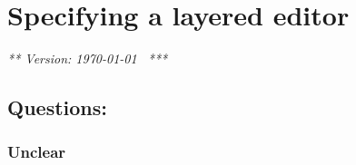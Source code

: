 \chapter{Specifying a layered editor}
\label{chap:singleLayer}

\renewcommand{\present}{\ensuremath{\mathit{present}}}
\renewcommand{\interpret}{\ensuremath{\mathit{interpret}}}
\newcommand{\spc}{\textvisiblespace}


\renewcommand{\H}{_{\, \mathrm H}}  %
\renewcommand{\L}{_{\, \mathrm L}} %
\newcommand{\M}{_{\, \mathrm M}}
\newcommand{\HH}{_{\, \mathrm {HH}}} 
\newcommand{\HL}{_{\, \mathrm {HL}}} 
\newcommand{\LH}{_{\, \mathrm {LH}}} 
\newcommand{\LL}{_{\, \mathrm {LL}}} 
\newcommand{\CH}{_{\, \mathrm {CH}}} 
\newcommand{\CL}{_{\, \mathrm {CL}}} 
\newcommand{\C}{_{\, \mathrm C}} 
\newcommand{\Eqclass}[2]{{#1}/_{\!{#2}}}
\newcommand{\eqclass}[2]{[\,{#1}\,]_{#2}}
\newcommand{\Eqcl}[2]{\Eqclass{#1}{\simeq {\mathrm {#2}}}}
\newcommand{\eqcl}[2]{\eqclass{#1}{\simeq {\mathrm {#2}}}}
\newcommand{\Eqstarcl}[2]{{#1}/_{\!\stackrel{*}{\simeq} {\mathrm {#2}}}}
\newcommand{\eqstarcl}[2]{[\,{#1}\,]_{\!\stackrel{*}{\simeq} {\mathrm {#2}}}}
\newcommand{\eqr}{\ensuremath{\simeq}}
\newcommand{\eqstar}{\ensuremath{\stackrel{*}{\simeq}}}
\newcommand{\reuz}{\ensuremath{\triangleright}}
\newcommand{\reuze}[1]{\ensuremath{\triangleright_{\!_\mathrm{#1}}}}
\newcommand{\reuzestar}{\ensuremath{\stackrel{*}{\triangleright}}}
\newcommand{\rel}{\ensuremath{\sim}}



{\em *** Version: \today~ ***}


\section{Questions:}

\subsection{Unclear}



